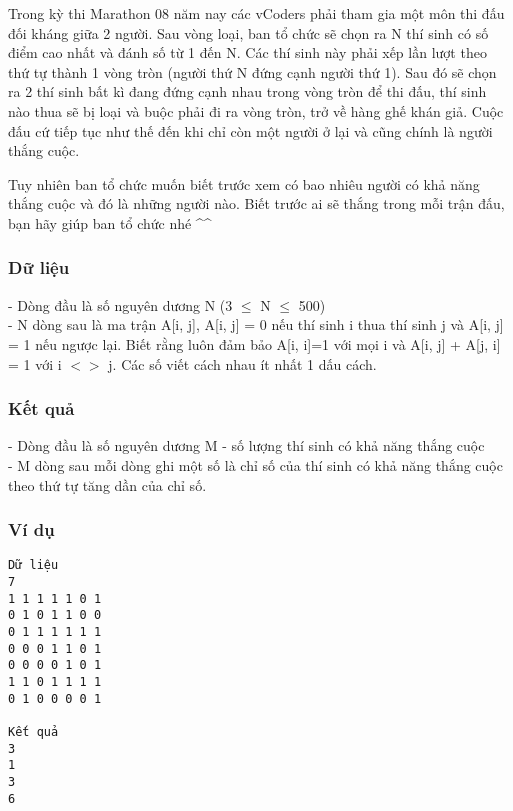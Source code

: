 



   Trong kỳ thi Marathon 08 năm nay các vCoders phải tham gia một môn thi đấu đối kháng giữa 2 người. Sau vòng loại, ban tổ chức sẽ chọn ra N thí sinh có số điểm cao nhất và đánh số từ 1 đến N. Các thí sinh này phải xếp lần lượt theo thứ tự thành 1 vòng tròn (người thứ N đứng cạnh người thứ 1). Sau đó sẽ chọn ra 2 thí sinh bất kì đang đứng cạnh nhau trong vòng tròn để thi đấu, thí sinh nào thua sẽ bị loại và buộc phải đi ra vòng tròn, trở về hàng ghế khán giả. Cuộc đấu cứ tiếp tục như thế đến khi chỉ còn một người ở lại và cũng chính là người thắng cuộc.  

   Tuy nhiên ban tổ chức muốn biết trước xem có bao nhiêu người có khả năng thắng cuộc và đó là những người nào. Biết trước ai sẽ thắng trong mỗi trận đấu, bạn hãy giúp ban tổ chức nhé \textasciicircum\textasciicircum  

\subsubsection{   Dữ liệu  }

   - Dòng đầu là số nguyên dương N (3  $\le$  N  $\le$  500)   
\\   - N dòng sau là ma trận A[i, j], A[i, j] = 0 nếu thí sinh i thua thí sinh j và A[i, j] = 1 nếu ngược lại. Biết rằng luôn đảm bảo A[i, i]=1 với mọi i và A[i, j] + A[j, i] = 1 với i $<$$>$ j. Các số viết cách nhau ít nhất 1 dấu cách.  

\subsubsection{   Kết quả  }

   - Dòng đầu là số nguyên dương M - số lượng thí sinh có khả năng thắng cuộc   
\\   - M dòng sau mỗi dòng ghi một số là chỉ số của thí sinh có khả năng thắng cuộc theo thứ tự tăng dần của chỉ số.  

\subsubsection{   Ví dụ  }
\begin{verbatim}
Dữ liệu
7
1 1 1 1 1 0 1
0 1 0 1 1 0 0
0 1 1 1 1 1 1
0 0 0 1 1 0 1
0 0 0 0 1 0 1
1 1 0 1 1 1 1
0 1 0 0 0 0 1

Kết quả
3
1
3
6
\end{verbatim}
